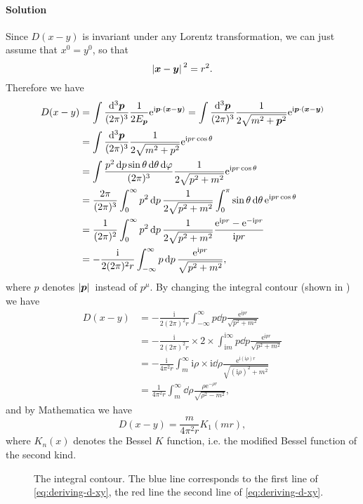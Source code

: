 \documentclass[hyperref, a4paper]{article}
\newcommand*{\ii}{\mathrm{i}}
\newcommand*{\ee}{\mathrm{e}}
\begin{document}
\paragraph{Solution} Since $D(x - y)$ is invariant under any Lorentz transformation, we can just assume that $x^0 = y^0$, so that 
\begin{equation}
    \abs*{\vb*{x} - \vb*{y}}^2 = r^2.
\end{equation}
Therefore we have 
\[
    \begin{aligned}
        D(x - y) &= \int \frac{\dd[3]{\vb*{p}}}{(2\pi)^3} \frac{1}{2 E_{\vb*{p}}} \ee^{\ii \vb*{p} \cdot (\vb*{x} - \vb*{y})} = \int \frac{\dd[3]{\vb*{p}}}{(2\pi)^3} \frac{1}{2 \sqrt{m^2 + \vb*{p}^2}} \ee^{\ii \vb*{p} \cdot (\vb*{x} - \vb*{y})} \\
        &= \int \frac{\dd[3]{\vb*{p}}}{(2\pi)^3} \frac{1}{2 \sqrt{m^2 + p^2}} \ee^{\ii p r \cos \theta } \\
        &= \int \frac{p^2 \dd{p} \sin \theta \dd{\theta} \dd{\varphi}}{(2\pi)^3} \frac{1}{2 \sqrt{p^2 + m^2}} \ee^{\ii p r \cos \theta} \\
        &= \frac{2\pi}{(2\pi)^3} \int_0^\infty p^2 \dd{p} \frac{1}{2 \sqrt{p^2 + m^2}} \int_0^\pi \sin \theta \dd{\theta} \ee^{\ii p r \cos \theta} \\
        &= \frac{1}{(2\pi)^2} \int_0^\infty p^2 \dd{p} \frac{1}{2 \sqrt{p^2 + m^2}} \frac{\ee^{\ii p r} - \ee^{- \ii p r}}{\ii p r} \\
        &= - \frac{\ii}{2 (2\pi)^2 r} \int_{-\infty}^\infty p \dd{p} \frac{\ee^{\ii p r}}{\sqrt{p^2 + m^2}},
    \end{aligned}
\]
where $p$ denotes $\abs*{\vb*{p}}$ instead of $p^\mu$.
By changing the integral contour (shown in ) we have 
\begin{equation}
    \begin{aligned}
        D(x-y) &= - \frac{\ii}{2 (2\pi)^2 r} \int^\infty_{-\infty} p \dd{p} \frac{\ee^{\ii p r}}{\sqrt{p^2 + m^2}} \\
        &= - \frac{\ii}{2 (2\pi)^2 r} \times 2 \times \int_{\ii m}^{\ii \infty} p \dd{p} \frac{\ee^{\ii p r}}{\sqrt{p^2 + m^2}} \\
        &= - \frac{\ii}{4 \pi^2 r} \int_m^\infty \ii \rho \times  \ii \dd{\rho} \frac{\ee^{\ii (\ii \rho) r}}{\sqrt{(\ii \rho)^2 + m^2}} \\
        &= \frac{1}{4\pi^2 r} \int_m^\infty \dd{\rho} \frac{\rho \ee^{-\rho r}}{\sqrt{\rho^2 - m^2}},
    \end{aligned}
    \label{eq:deriving-d-xy}
\end{equation}
and by Mathematica we have 
\begin{equation}
    D(x-y) = \frac{m}{4\pi^2 r} K_1(mr),
\end{equation}
where $K_n(x)$ denotes the Bessel $K$ function, i.e. the modified Bessel function of the second kind.

\begin{figure}
    \centering
    
    \caption{The integral contour. The blue line corresponds to the first line of \eqref{eq:deriving-d-xy}, the red line the second line of \eqref{eq:deriving-d-xy}. }
    \label{fig:the-integral-contour}
\end{figure}
\end{document}
